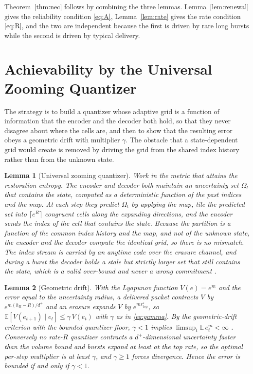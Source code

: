 \documentclass[journal]{IEEEtran}
\newtheorem{lemma}{Lemma}
\theoremstyle{definition}
\theoremstyle{remark}
\newcommand{\rtop}{r^\star_{\mathrm{top}}}
\newcommand{\hR}{h_R}
\newcommand{\E}{\mathbb{E}}
\newcommand{\dplus}{d^{+}}
\begin{document}
Theorem~\ref{thm:nec} follows by combining the three lemmas. Lemma~\ref{lem:renewal} gives the reliability
condition \eqref{eq:A}, Lemma~\ref{lem:rate} gives the rate condition \eqref{eq:R}, and the two are independent
because the first is driven by rare long bursts while the second is driven by typical delivery.

\section{Achievability by the Universal Zooming Quantizer}\label{sec:ach}
The strategy is to build a quantizer whose adaptive grid is a function of information that the encoder and the
decoder both hold, so that they never disagree about where the cells are, and then to show that the resulting
error obeys a geometric drift with multiplier $\gamma$. The obstacle that a state-dependent grid would create is
removed by driving the grid from the shared index history rather than from the unknown state.

\begin{lemma}[Universal zooming quantizer]\label{lem:uzq}
Work in the metric that attains the restoration entropy. The encoder and decoder both maintain an uncertainty set
$\Omega_t$ that contains the state, computed as a deterministic function of the past indices and the map. At each
step they predict $\Omega_t$ by applying the map, tile the predicted set into $\lceil e^{R}\rceil$ congruent
cells along the expanding directions, and the encoder sends the index of the cell that contains the state. Because
the partition is a function of the common index history and the map, and not of the unknown state, the encoder
and the decoder compute the identical grid, so there is no mismatch. The index stream is carried by an anytime
code over the erasure channel, and during a burst the decoder holds a stale but strictly larger set that still
contains the state, which is a valid over-bound and never a wrong commitment \cite{matveevpogromsky2016,sukhavasi2016}.
\end{lemma}

\begin{lemma}[Geometric drift]\label{lem:drift}
With the Lyapunov function $V(e)=e^{m}$ and the error equal to the uncertainty radius, a delivered packet
contracts $V$ by $e^{m(\hR-R)/\dplus}$ and an erasure expands $V$ by $e^{m\rtop}$, so
$\E[V(e_{t+1})\mid e_t]\le\gamma\,V(e_t)$ with $\gamma$ as in \eqref{eq:gamma}. By the geometric-drift criterion
with the bounded quantizer floor, $\gamma<1$ implies $\limsup_t\E\,e_t^{m}<\infty$ \cite{meyntweedie2009}.
Conversely no rate-$R$ quantizer contracts a $\dplus$-dimensional uncertainty faster than the volume bound and
bursts expand at least at the top rate, so the optimal per-step multiplier is at least $\gamma$, and $\gamma\ge1$
forces divergence. Hence the error is bounded if and only if $\gamma<1$.
\end{lemma}
\end{document}

